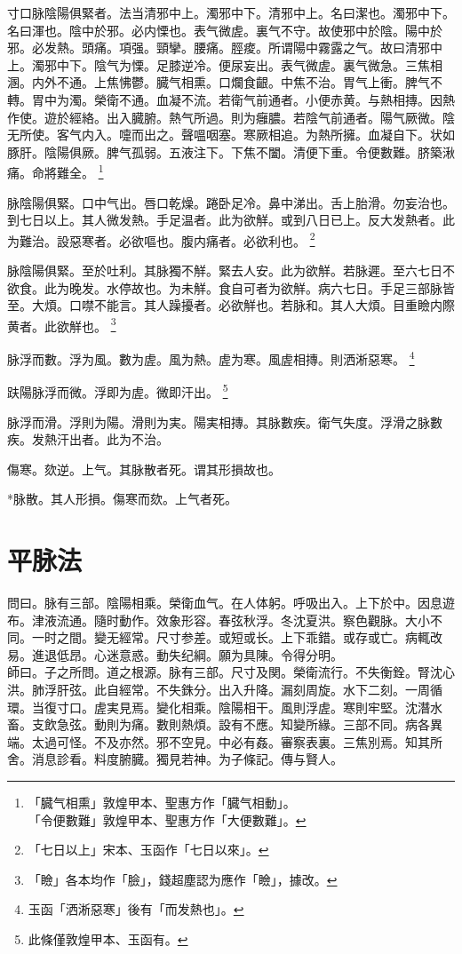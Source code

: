 \documentclass[12pt,twoside,UTF8,b5paper]{ctexbook}
\begin{document}
寸口脉陰陽俱緊者。法当清邪中上。濁邪中下。清邪中上。名曰潔也。濁邪中下。名曰渾也。陰中於邪。必内慄也。表气微虗。裏气不守。故使邪中於陰。陽中於邪。必发熱。頭痛。項强。頸攣。腰痛。脛痠。所谓陽中霧露之气。故曰清邪中上。濁邪中下。陰气为慄。足膝逆冷。便尿妄出。表气微虗。裏气微急。三焦相溷。内外不通。上焦怫鬱。臓气相熏。口爛食齦。中焦不治。胃气上衝。脾气不轉。胃中为濁。榮衛不通。血凝不流。若衛气前通者。小便赤黄。与熱相摶。因熱作使。遊於經絡。出入臓腑。熱气所過。則为癰膿。若陰气前通者。陽气厥微。陰无所使。客气内入。嚏而出之。聲嗢咽塞。寒厥相追。为熱所擁。血凝自下。状如豚肝。陰陽俱厥。脾气孤弱。五液注下。下焦不闔。清便下重。令便數難。脐築湫痛。命將難全。
	\footnote{「臓气相熏」敦煌甲本、聖惠方作「臓气相動」。\\「令便數難」敦煌甲本、聖惠方作「大便數難」。}

脉陰陽俱緊。口中气出。唇口乾燥。踡卧足冷。鼻中涕出。舌上胎滑。勿妄治也。到七日以上。其人微发熱。手足温者。此为欲觧。或到八日已上。反大发熱者。此为難治。設惡寒者。必欲嘔也。腹内痛者。必欲利也。
	\footnote{「七日以上」宋本、玉函作「七日以來」。}

脉陰陽俱緊。至於吐利。其脉獨不觧。緊去人安。此为欲觧。若脉遲。至六七日不欲食。此为晚发。水停故也。为未觧。食自可者为欲觧。病六七日。手足三部脉皆至。大煩。口噤不能言。其人躁擾者。必欲觧也。若脉和。其人大煩。目重瞼内際黄者。此欲觧也。
	\footnote{「瞼」各本均作「臉」，錢超塵認为應作「瞼」，據改。}

脉浮而數。浮为風。數为虗。風为熱。虗为寒。風虗相摶。則洒淅惡寒。
	\footnote{玉函「洒淅惡寒」後有「而发熱也」。}

趺陽脉浮而微。浮即为虗。微即汗出。
	\footnote{此條僅敦煌甲本、玉函有。}

脉浮而滑。浮{則}为陽。滑{則}为実。陽実相摶。其脉數疾。衛气失度。浮滑之脉數疾。发熱汗出者。此为不治。

傷寒。欬逆。上气。其脉散者死。谓其形損故也。

*脉散。其人形損。傷寒而欬。上气者死。

\chapter{平脉法}

問曰。脉有三部。陰陽相乘。榮衛血气。在人体躬。呼吸出入。上下於中。因息遊布。津液流通。隨时動作。效象形容。春弦秋浮。冬沈夏洪。察色觀脉。大小不同。一时之間。變无經常。尺寸参差。或短或长。上下乖錯。或存或亡。病輒改易。進退低昂。心迷意惑。動失纪綱。願为具陳。令得分明。\\
師曰。子之所問。道之根源。脉有三部。尺寸及関。榮衛流行。不失衡銓。腎沈心洪。肺浮肝弦。此自經常。不失銖分。出入升降。漏刻周旋。水下二刻。一周循環。当復寸口。虗実見焉。變化相乘。陰陽相干。風則浮虗。寒則牢堅。沈潛水畜。支飲急弦。動則为痛。數則熱煩。設有不應。知變所緣。三部不同。病各異端。太過可怪。不及亦然。邪不空見。中必有姦。審察表裏。三焦別焉。知其所舍。消息診看。料度腑臓。獨見若神。为子條記。傳与賢人。
\end{document}
